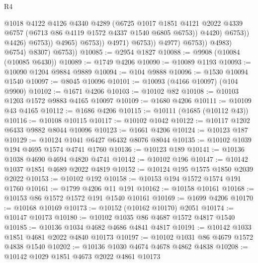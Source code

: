 \begin{lexlean}{R4}
\begin{coremodule}
                                            @1018
                                            @4122
                                            @4126
                                            @4340
                                            @4289
                                            (@6725
                                              @1017
                                              @1851
                                              @4121
                                              @2022
                                              @4339
                                              @6757
                                              (@6713 @86 @4119 @1572 @4337 @1540 @6805 @6753))
                                            @4420)
                                          @6753))
                                      @4426)
                                    @6753))
                                @4965)
                              @6753))
                          @4971)
                        @6753))
                    @4977)
                  @6753))
              @4983)
            @6754)
          @8307)
        @6753))
@10085 := @2954 @1827
@10088 := @9908 (@10084 (@10085 @6430))
@10089 := @1749 @4206
@10090 := @10089 @1193
@10093 := @10090 @1204 @9884 @9889
@10094 := @104 @9888
@10096 := @1530 @10094 @1540
@10097 := @8045 @10096
@10101 := @10093 (@4166 @10097) (@104 @9900)
@10102 := @1671 @4206
@10103 := @10102 @82
@10108 := @10103 @1203 @1572 @9883 @4165 @10097
@10109 := @1680 @4206
@10111 := @10109 @43 @4165
@10112 := @1686 @4206
@10115 := @10111 (@1685 (@10112 @43))
@10116 := @10108 @10115
@10117 := @10102 @1042
@10122 := @10117 @1202 @6433 @9882 @8044 @10096
@10123 := @1661 @4206
@10124 := @10123 @187
@10129 := @10124 @1041 @6427 @6432 @8076 @8044
@10135 := @10102 @1039 @194 @4695 @1574 @4741 @1760
@10136 := @10123 @189
@10141 := @10136 @1038 @4690 @4694 @4820 @4741
@10142 := @10102 @196
@10147 := @10142 @1037 @1851 @4689 @2022 @4819
@10152 := @10124 @195 @1575 @1850 @2039 @2022
@10153 := @10102 @192
@10158 := @10153 @194 @1572 @1574 @191 @1760
@10161 := @1799 @4206 @11 @191
@10162 := @10158 @10161
@10168 := @10153 @86 @1572 @1572 @191 @1540 @10161
@10169 := @1699 @4206
@10170 := @10168 @10169
@10173 := @10152 (@10162 @10170) @2051
@10174 := @10147 @10173
@10180 := @10102 @1035 @86 @4687 @1572 @4817 @1540
@10185 := @10136 @1034 @4682 @4686 @4841 @4817
@10191 := @10142 @1033 @1851 @4681 @2022 @4840 @10173
@10197 := @10102 @1031 @86 @4679 @1572 @4838 @1540
@10202 := @10136 @1030 @4674 @4678 @4862 @4838
@10208 := @10142 @1029 @1851 @4673 @2022 @4861 @10173

\end{coremodule}
\end{lexlean}
